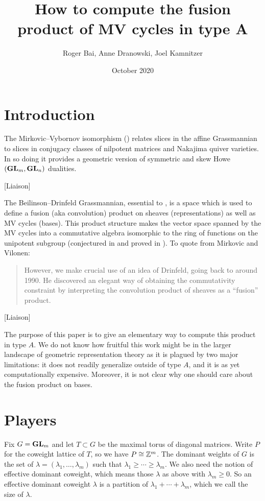 \documentclass{article}
\title{How to compute the fusion product of MV cycles in type A}
\author{Roger Bai, Anne Dranowski, Joel Kamnitzer}
\date{October 2020}
\begin{document}
\maketitle

\section{Introduction}
% 
The Mirkovic--Vybornov isomorphism (\cite{mirkovic2007quiver,mirkovic2019comparison}) relates slices in the affine Grassmannian to slices in conjugacy classes of nilpotent matrices and Nakajima quiver varieties. In so doing it provides a geometric version of symmetric and skew Howe $({\mathbf{GL}}_m,{\mathbf{GL}}_n)$ dualities. 
% 

[Liaison]

The Beilinson--Drinfeld Grassmannian, essential to \cite{mirkovic2007geometric}, is a space which is used to define a fusion (aka convolution) product on sheaves (representations) as well as MV cycles (bases). 
% 
This product structure makes the vector space spanned by the MV cycles into a commutative algebra isomorphic to the ring of functions on the unipotent subgroup (conjectured in \cite{anderson2003polytope} and proved in \cite{baumann2019mirkovic}). %
% 
To quote from Mirkovic and Vilonen:
\begin{quotation}
    However, we make crucial use of an idea of Drinfeld, going back to around 1990. He discovered an elegant way of obtaining the commutativity constraint by interpreting the convolution product of sheaves as a ``fusion'' product.
\end{quotation}
% 
[Liaison]

The purpose of this paper is to give an elementary way to compute this product in type $A$. We do not know how fruitful this work might be in the larger landscape of geometric representation theory as it is plagued by two major limitations: it does not readily generalize outside of type $A$, and it is as yet computationally expensive. 
% 
Moreover, it is not clear why one should care about the fusion product on bases.     

\section{Players}

Fix $G = {\mathbf{GL}}_m$ and let $T\subset G$ be the maximal torus of diagonal matrices. 
Write $P$ for the coweight lattice of $T$, so we have $P\cong \mathbb Z^m$.  The dominant weights of $ G $ is the set of $ \lambda = (\lambda_1, \dots, \lambda_m) $ such that $ \lambda_1 \ge \cdots \ge \lambda_m$.  We also need the notion of effective dominant coweight, which means those $ \lambda $ as above with $ \lambda_m \ge 0$.  So an effective dominant coweight $ \lambda $ is a partition of $ \lambda_1 + \cdots + \lambda_m$, which we call the size of $ \lambda$.
\end{document}

